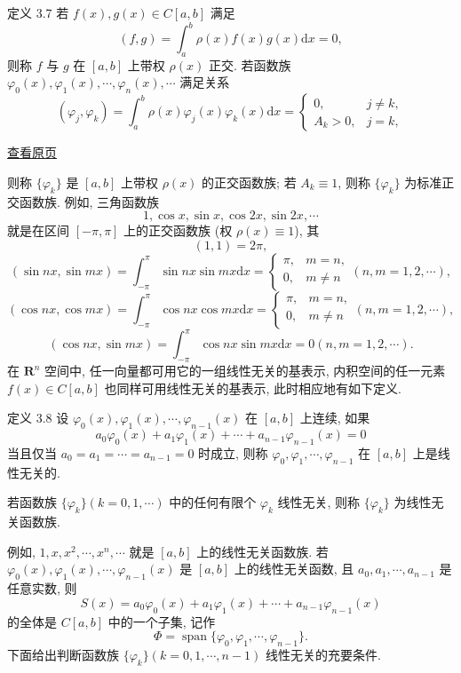 \documentclass[
  10pt,
  fontset=fandol]{ctexart}
\begin{document}
定义 3.7 若 \(f(x), g(x) \in C[a, b]\) 满足 \[
(f, g) = \int_{a}^{b} \rho(x) f(x) g(x) \mathrm{d}x = 0, \tag{3.3.7}
\] 则称 \(f\) 与 \(g\) 在 \([a, b]\) 上带权 \(\rho(x)\) 正交. 若函数族 \(\varphi_{0}(x), \varphi_{1}(x), \cdots, \varphi_{n}(x), \cdots\) 满足关系 \[
(\varphi_{j}, \varphi_{k}) = \int_{a}^{b} \rho(x) \varphi_{j}(x) \varphi_{k}(x) \mathrm{d}x = \begin{cases} 0, & j \neq k, \\ A_{k} > 0, & j = k, \end{cases} \tag{3.3.8}
\]

\href{../../source-images/pdf-067.jpeg}{查看原页}

则称 \(\{\varphi_k\}\) 是 \([a,b]\) 上带权 \(\rho(x)\) 的正交函数族; 若 \(A_k \equiv 1\), 则称 \(\{\varphi_k\}\) 为标准正交函数族. 例如, 三角函数族 \[
1, \cos x, \sin x, \cos 2x, \sin 2x, \cdots
\] 就是在区间 \([-\pi, \pi]\) 上的正交函数族 (权 \(\rho(x) \equiv 1\)), 其 \[
(1,1) = 2\pi,
\] \[
(\sin nx, \sin mx) = \int_{-\pi}^{\pi} \sin nx \sin mx \mathrm{d}x = \begin{cases} \pi, & m=n, \\ 0, & m \neq n \end{cases} (n,m=1,2, \cdots),
\] \[
(\cos nx, \cos mx) = \int_{-\pi}^{\pi} \cos nx \cos mx \mathrm{d}x = \begin{cases} \pi, & m=n, \\ 0, & m \neq n \end{cases} (n,m=1,2, \cdots),
\] \[
(\cos nx, \sin mx) = \int_{-\pi}^{\pi} \cos nx \sin mx \mathrm{d}x = 0 (n,m=1,2, \cdots).
\] 在 \(\mathbf{R}^n\) 空间中, 任一向量都可用它的一组线性无关的基表示, 内积空间的任一元素 \(f(x) \in C[a,b]\) 也同样可用线性无关的基表示, 此时相应地有如下定义.

定义 3.8 设 \(\varphi_0(x), \varphi_1(x), \cdots, \varphi_{n-1}(x)\) 在 \([a,b]\) 上连续, 如果 \[
a_0 \varphi_0(x) + a_1 \varphi_1(x) + \cdots + a_{n-1} \varphi_{n-1}(x) = 0
\] 当且仅当 \(a_0 = a_1 = \cdots = a_{n-1} = 0\) 时成立, 则称 \(\varphi_0, \varphi_1, \cdots, \varphi_{n-1}\) 在 \([a,b]\) 上是线性无关的.

若函数族 \(\{\varphi_k\} (k=0,1, \cdots)\) 中的任何有限个 \(\varphi_k\) 线性无关, 则称 \(\{\varphi_k\}\) 为线性无关函数族.

例如, \(1,\allowbreak  x,\allowbreak  x^2,\allowbreak  \cdots,\allowbreak  x^n,\allowbreak  \cdots\) 就是 \([a,b]\) 上的线性无关函数族. 若 \(\varphi_0(x), \varphi_1(x), \cdots, \varphi_{n-1}(x)\) 是 \([a,b]\) 上的线性无关函数, 且 \(a_0, a_1, \cdots, a_{n-1}\) 是任意实数, 则 \[
S(x) = a_0 \varphi_0(x) + a_1 \varphi_1(x) + \cdots + a_{n-1} \varphi_{n-1}(x)
\] 的全体是 \(C[a,b]\) 中的一个子集, 记作 \[
\Phi = \operatorname{span}\{\varphi_0, \varphi_1, \cdots, \varphi_{n-1}\}. \tag{3.3.9}
\] 下面给出判断函数族 \(\{\varphi_k\} (k=0,1, \cdots, n-1)\) 线性无关的充要条件.
\end{document}

